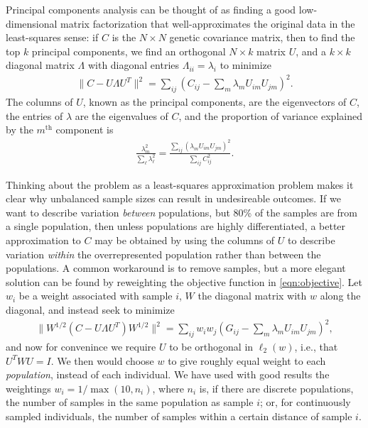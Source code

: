 \documentclass[11pt, oneside]{article}   	%
\newcommand\citep{\cite}
\begin{document}
Principal components analysis can be thought of as finding a good low-dimensional matrix factorization \citep{engelhardt2010analysis}
that well-approximates the original data in the least-squares sense:
if $C$ is the $N \times N$ genetic covariance matrix,
then to find the top $k$ principal components, 
we find an orthogonal $N \times k$ matrix $U$,
and a $k \times k$ diagonal matrix $\Lambda$ with diagonal entries $\Lambda_{ii}=\lambda_i$ to minimize
\begin{align} \label{eqn:objective}
    \| C - U \Lambda U^T \|^2 = \sum_{ij} \left( C_{ij} - \sum_m \lambda_{m} U_{im} U_{jm} \right)^2 .
\end{align}
The columns of $U$, known as the principal components, are the eigenvectors of $C$,
the entries of $\lambda$ are the eigenvalues of $C$, 
and the proportion of variance explained by the $m^\text{th}$ component is
\begin{align*}
    \frac{ \lambda_m^2 }{ \sum_\ell \lambda_\ell^2 } = \frac{ \sum_{ij} ( \lambda_m U_{im} U_{jm} )^2 }{ \sum_{ij} C_{ij}^2 } .
\end{align*}

Thinking about the problem as a least-squares approximation problem
makes it clear why unbalanced sample sizes can result in undesireable outcomes.
If we want to describe variation \emph{between} populations,
but 80\% of the samples are from a single population,
then unless populations are highly differentiated, 
a better approximation to $C$ may be obtained by using the columns of $U$ to describe variation \emph{within} the overrepresented population
rather than between the populations.
A common workaround is to remove samples,
but a more elegant solution can be found by reweighting the objective function in \eqref{eqn:objective}.
Let $w_{i}$ be a weight associated with sample $i$,
$W$ the diagonal matrix with $w$ along the diagonal,
and instead seek to minimize
\begin{align} \label{eqn:weighted_objective}
    \| W^{1/2} (C - U \Lambda U^T) W^{1/2} \|^2 = \sum_{ij} w_i w_j \left( G_{ij} - \sum_m \lambda_{m} U_{im} U_{jm} \right)^2 ,
\end{align}
and now for convenince we require $U$ to be orthogonal in $\ell_2(w)$, i.e., that $U^T W U =I$.
We then would choose $w$ to give roughly equal weight to each \emph{population},
instead of each individual.
We have used with good results the weightings
$w_i = 1/\max(10,n_i)$,
where $n_i$ is, if there are discrete populations,
the number of samples in the same population as sample $i$;
or, for continuously sampled individuals,
the number of samples within a certain distance of sample $i$.
\end{document}

